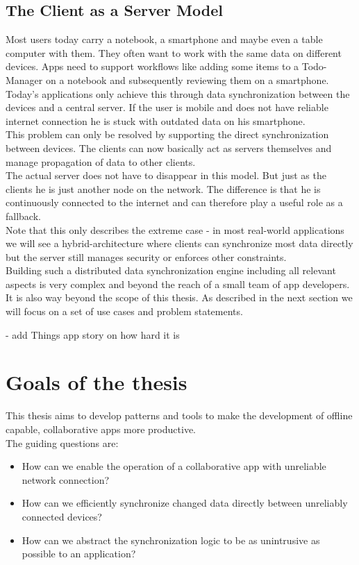 \subsection{The Client as a Server Model}
Most users today carry a notebook, a smartphone and maybe even a table computer with them. They often want to work with the same data on different devices. Apps need to support workflows like adding some items to a Todo-Manager on a notebook and subsequently reviewing them on a smartphone. Today's applications only achieve this through  data synchronization between the devices and a central server. If the user is mobile and does not have reliable internet connection he is stuck with outdated data on his smartphone.\\
This problem can only be resolved by supporting the direct synchronization between devices. The clients can now basically act as servers themselves and manage propagation of data to other clients.\\
The actual server does not have to disappear in this model. But just as the clients he is just another node on the network. The difference is that he is continuously connected to the internet and can therefore play a useful role as a fallback.\\
Note that this only describes the extreme case - in most real-world applications we will see a hybrid-architecture where clients can synchronize most data directly but the server still manages security or enforces other constraints.\\
Building such a distributed data synchronization engine including all relevant aspects is very complex and beyond the reach of a small team of app developers. It is also way beyond the scope of this thesis. As described in the next section we will focus on a set of use cases and problem statements.

- add Things app story on how hard it is

\section{Goals of the thesis}
This thesis aims to develop patterns and tools to make the development of offline capable, collaborative apps more productive.\\

The guiding questions are:
\begin{itemize}
\item How can we enable the operation of a collaborative app with unreliable network connection?
\item How can we efficiently synchronize changed data directly between unreliably connected devices?
\item How can we abstract the synchronization logic to be as unintrusive as possible to an application?\\
\end{itemize}

